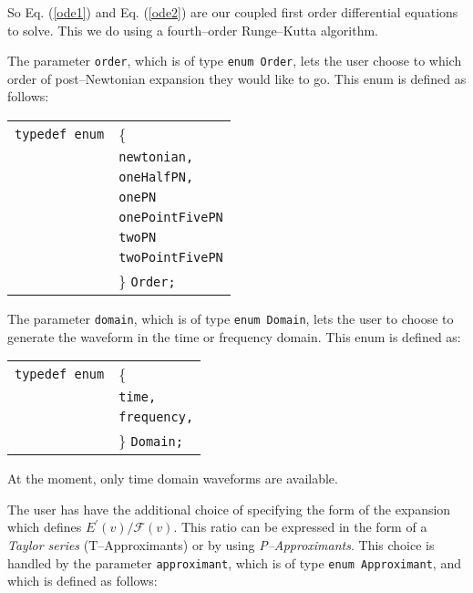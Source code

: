 \documentclass[12pt]{article}
\begin{document}
So Eq. (\ref{ode1}) and Eq. (\ref{ode2}) are our coupled first order differential equations to solve. This we do using a fourth--order Runge--Kutta algorithm.



The parameter \texttt{order}, which is of type \texttt{enum Order}, lets the user choose to which order of post--Newtonian expansion they would like to go. This enum is defined as follows:

\vspace{5mm}

\begin{tabular}{ll}
\texttt{typedef enum} & \{ \\
                      & \texttt{newtonian,} \\
                      & \texttt{oneHalfPN,}  \\
                      & \texttt{onePN} \\
                      & \texttt{onePointFivePN} \\
                      & \texttt{twoPN} \\
                      & \texttt{twoPointFivePN} \\
                      & \} \texttt{Order;}
\end{tabular}

\vspace{5mm}


The parameter \texttt{domain}, which is of type \texttt{enum Domain}, lets the user to choose to generate the waveform in the time or frequency domain. This enum is defined as:

\vspace{5mm}

\begin{tabular}{ll}
\texttt{typedef enum} & \{ \\
                      & \texttt{time,} \\
                      & \texttt{frequency,}  \\
                      & \} \texttt{Domain;}
\end{tabular}

\vspace{5mm}

At the moment, only time domain waveforms are available.

The user has have the additional choice of specifying the form of the expansion which defines $E^{\prime}(v)/\mathcal{F}(v)$. This ratio can be expressed in the form of a \emph{Taylor series} (T--Approximants) or by using \emph{P--Approximants}. This choice is handled by the parameter \texttt{approximant}, which is of type \texttt{enum Approximant}, and which is defined as follows:
\end{document}
